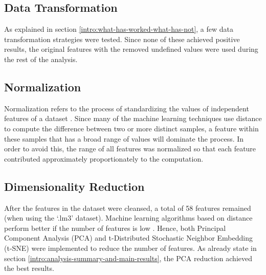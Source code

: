 \subsection{Data Transformation}

As explained in section \ref{intro:what-has-worked-what-has-not}, a few data transformation strategies were tested. Since none of these achieved positive results, the original features with the removed undefined values were used during the rest of the analysis.

\subsection{Normalization}

Normalization refers to the process of standardizing the values of independent features of a dataset \cite{data-mining-intro}. Since many of the machine learning techniques use distance to compute the difference between two or more distinct samples, a feature within these samples that has a broad range of values will dominate the process. In order to avoid this, the range of all features was normalized so that each feature contributed approximately proportionately to the computation.

\subsection{Dimensionality Reduction}

After the features in the dataset were cleansed, a total of 58 features remained (when using the `.lm3' dataset). Machine learning algorithms based on distance perform better if the number of features is low \cite{data-mining-intro}. Hence, both Principal Component Analysis (PCA) and t-Distributed Stochastic Neighbor Embedding (t-SNE) were implemented to reduce the number of features. As already state in section \ref{intro:analysis-summary-and-main-results}, the PCA reduction achieved the best results.
